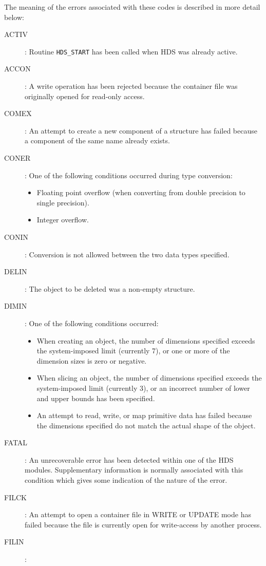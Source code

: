 The meaning of the errors associated with these codes is described in more
detail below:

\begin{description}
\item [ACTIV]:
Routine {\tt HDS\_START} has been called when HDS was already active.
\item [ACCON]:
A write operation has been rejected because the container file was originally
opened for read-only access.
\item [COMEX]:
An attempt to create a new component of a structure has failed because a
component of the same name already exists.
\item [CONER]:
One of the following conditions occurred during type conversion:
\begin{itemize}
\item Floating point overflow (when converting from double precision to single
precision).
\item Integer overflow.
\end{itemize}
\item [CONIN]:
Conversion is not allowed between the two data types specified.
\item [DELIN]:
The object to be deleted was a non-empty structure.
\item [DIMIN]:
One of the following conditions occurred:
\begin{itemize}
\item When creating an object, the number of dimensions specified exceeds the
system-imposed limit (currently 7), or one or more of the dimension sizes is
zero or negative.
\item When slicing an object, the number of dimensions specified exceeds the
system-imposed limit (currently 3), or an incorrect number of lower and upper
bounds has been specified.
\item An attempt to read, write, or map primitive data has failed because the
dimensions specified do not match the actual shape of the object.
\end{itemize}
\item [FATAL]:
An unrecoverable error has been detected within one of the HDS modules.
Supplementary information is normally associated with this condition which gives
some indication of the nature of the error.
\item [FILCK]:
An attempt to open a container file in WRITE or UPDATE mode has failed
because the file is currently open for write-access by another process.
\item [FILIN]:

\end{description}
